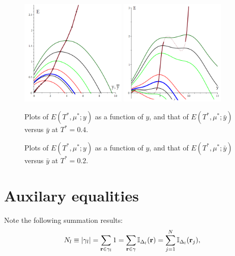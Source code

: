 \documentclass[12pt]{article}
\numberwithin{equation}{section}
\begin{document}
	\begin{figure}[htbp]
		\includegraphics[width=0.45\textwidth,angle=0]{images/EvsYvs_barY_a1}
		\hfill
		\includegraphics[width=0.45\textwidth,angle=0]{images/EvsYvs_barY_b1}
		\vfill
		\parbox{0.45\textwidth}{\caption{\label{fig:EvsYvs_barY_a10} Plots of $E(T^*,\mu^*;y)$ as a function of $y$, and that of $E(T^*,\mu^*;\bar{y})$ versus $\bar{y}$ at $T^* = 0.4$.}}
		\hfill
		\parbox{0.45\textwidth}{\caption{\label{fig:EvsYvs_barY_b10} Plots of $E(T^*,\mu^*;y)$ as a function of $y$, and that of $E(T^*,\mu^*;\bar{y})$ versus $\bar{y}$ at $T^* = 0.2$.}}
		
	\end{figure}
	
	\appendix
	
	\pagebreak
	
	\section{Auxilary equalities}
	Note the following summation results:
	\begin{equation}
		\label{eq:1}
		N_l \equiv \abs{\gamma_l} = \sum_{\vb{r} \in \gamma_l} 1 = \sum_{\vb{r} \in \gamma} \mathbb{I}_{\Delta_l}(\vb{r}) = \sum_{j=1}^{N} \mathbb{I}_{\Delta_{l}}(\vb{r}_j),
	\end{equation}
	
\end{document}
